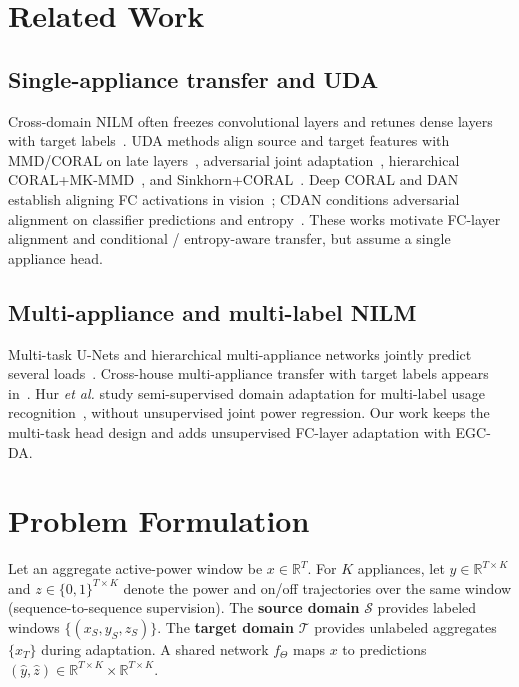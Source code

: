 \documentclass[journal]{IEEEtran}
\begin{document}
\section{Related Work}
\subsection{Single-appliance transfer and UDA}
Cross-domain NILM often freezes convolutional layers and retunes dense layers with target labels~\cite{dincecco2020transfer}.
UDA methods align source and target features with MMD/CORAL on late layers~\cite{lin2022dda}, adversarial joint adaptation~\cite{liu2022uda}, hierarchical CORAL+MK-MMD~\cite{xiong2026ahda}, and Sinkhorn+CORAL~\cite{lu2026edge}.
Deep CORAL and DAN establish aligning FC activations in vision~\cite{sun2016deepcoral,long2015dan}; CDAN conditions adversarial alignment on classifier predictions and entropy~\cite{long2018cdan}.
These works motivate FC-layer alignment and conditional / entropy-aware transfer, but assume a single appliance head.

\subsection{Multi-appliance and multi-label NILM}
Multi-task U-Nets and hierarchical multi-appliance networks jointly predict several loads~\cite{faustine2020unet,xiong2023matnilm}.
Cross-house multi-appliance transfer with target labels appears in~\cite{li2023multiobjective,sun2025transfer}.
Hur \emph{et al.} study semi-supervised domain adaptation for multi-label usage recognition~\cite{hur2022ssda}, without unsupervised joint power regression.
Our work keeps the multi-task head design and adds unsupervised FC-layer adaptation with EGC-DA.

\section{Problem Formulation}
Let an aggregate active-power window be $x\in\mathbb{R}^{T}$.
For $K$ appliances, let $y\in\mathbb{R}^{T\times K}$ and $z\in\{0,1\}^{T\times K}$ denote the power and on/off trajectories over the same window (sequence-to-sequence supervision).
The \textbf{source domain} $\mathcal{S}$ provides labeled windows $\{(x_S,y_S,z_S)\}$.
The \textbf{target domain} $\mathcal{T}$ provides unlabeled aggregates $\{x_T\}$ during adaptation.
A shared network $f_\Theta$ maps $x$ to predictions $(\hat{y},\hat{z})\in\mathbb{R}^{T\times K}\times\mathbb{R}^{T\times K}$.
\end{document}
